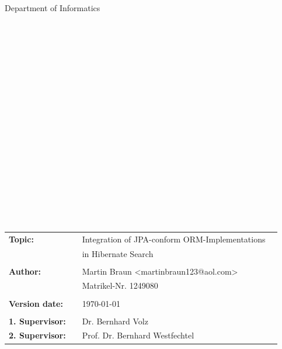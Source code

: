 \begin{center}
\Large{Department of Informatics}
\end{center}
\begin{verbatim}








\end{verbatim}
\begin{center}
\doublespacing
\textbf{\LARGE{\titleDocument}}\\
\singlespacing
\begin{verbatim}

\end{verbatim}
\textbf{{~\subjectDocument}}
\end{center}
\begin{verbatim}

\end{verbatim}
\begin{center}

\end{center}
\begin{verbatim}






\end{verbatim}
\begin{flushleft}
\begin{tabular}{llll}
\textbf{Topic:} & & Integration of JPA-conform ORM-Implementations & \\
	& & in Hibernate Search & \\
& & \\
\textbf{Author:} & & Martin Braun <martinbraun123@aol.com>& \\
& & Matrikel-Nr. 1249080 & \\
& & \\
\textbf{Version date:} & & \today &\\
& & \\
\textbf{1. Supervisor:} & & Dr. Bernhard Volz &\\
\textbf{2. Supervisor:} & & Prof. Dr. Bernhard Westfechtel &\\
\end{tabular}
\end{flushleft}